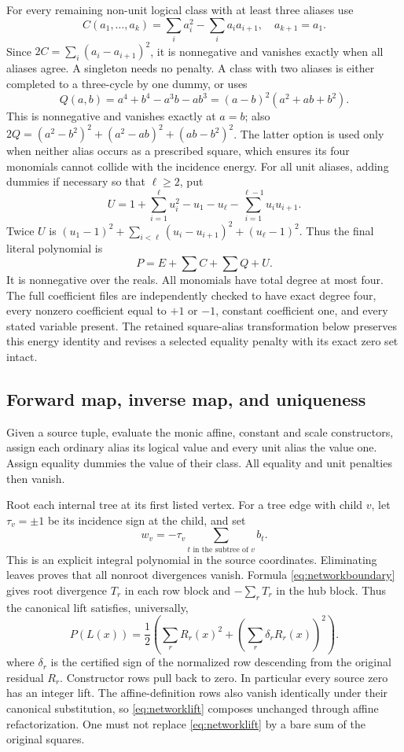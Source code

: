 For every remaining non-unit logical class with at least three aliases use
\[
 C(a_1,\ldots,a_k)=\sum_i a_i^2-\sum_i a_i a_{i+1},\quad a_{k+1}=a_1.
\]
Since $2C=\sum_i(a_i-a_{i+1})^2$, it is nonnegative and vanishes exactly
when all aliases agree. A singleton needs no penalty. A class with two
aliases is either completed to a three-cycle by one dummy, or uses
\[
 Q(a,b)=a^4+b^4-a^3b-ab^3=(a-b)^2(a^2+ab+b^2).
\]
This is nonnegative and vanishes exactly at $a=b$; also
$2Q=(a^2-b^2)^2+(a^2-ab)^2+(ab-b^2)^2$. The latter option is used only
when neither alias occurs as a prescribed square, which ensures its four
monomials cannot collide with the incidence energy. For all unit aliases,
adding dummies if necessary so that $\ell\ge2$, put
\[
 U=1+\sum_{i=1}^{\ell}u_i^2-u_1-u_\ell-
       \sum_{i=1}^{\ell-1}u_iu_{i+1}.
\]
Twice $U$ is $(u_1-1)^2+\sum_{i<\ell}(u_i-u_{i+1})^2+(u_\ell-1)^2$.
Thus the final literal polynomial is
\begin{equation}\label{eq:networkenergy}
 \boxed{P=E+\sum C+\sum Q+U.}
\end{equation}
It is nonnegative over the reals. All monomials have total degree at most
four. The full coefficient files are independently checked to have exact
degree four, every nonzero coefficient equal to $+1$ or $-1$, constant
coefficient one, and every stated variable present. The retained square-alias transformation below preserves this energy identity
and revises a selected equality penalty with its exact zero set intact.

\subsection{Forward map, inverse map, and uniqueness}
Given a source tuple, evaluate the monic affine, constant and scale
constructors, assign each ordinary alias its logical value and every unit
alias the value one. Assign equality dummies the value of their class.
All equality and unit penalties then vanish.

Root each internal tree at its first listed vertex. For a tree edge with
child $v$, let $\tau_v=\pm1$ be its incidence sign at the child, and set
\[
 w_v=-\tau_v\sum_{t\text{ in the subtree of }v}b_t.
\]
This is an explicit integral polynomial in the source coordinates.
Eliminating leaves proves that all nonroot divergences vanish. Formula
\eqref{eq:networkboundary} gives root divergence $T_r$ in each row block and $-\sum_rT_r$ in the
hub block. Thus the canonical lift satisfies, universally,
\begin{equation}\label{eq:networklift}
 P(L(x))=\frac12\left(\sum_rR_r(x)^2+
                \left(\sum_r\delta_rR_r(x)\right)^2\right).
\end{equation}
where $\delta_r$ is the certified sign of the normalized row descending
from the original residual $R_r$. Constructor rows pull back to zero.
In particular every source zero has an integer lift. The affine-definition
rows also vanish identically under their canonical substitution, so \eqref{eq:networklift}
composes unchanged through affine refactorization. One must not replace
\eqref{eq:networklift} by a bare sum of the original squares.

